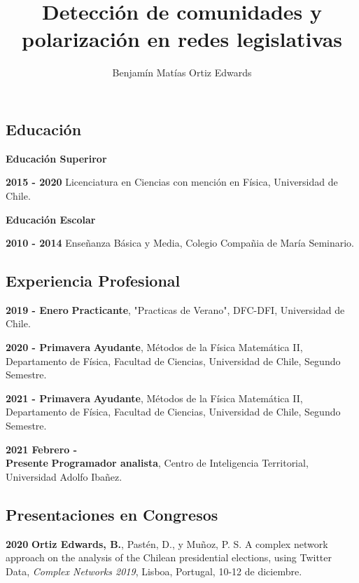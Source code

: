 \documentclass{proyectotesis}
\title{Detección de comunidades y polarización en redes legislativas}
\author{Benjamín Matías Ortiz Edwards}
\begin{document}
\maketitlepage
\makepersonalinfo

\subsection{Educación}
\begin{cvlist}{}
\item[\textbf{Educación Superiror}] 
\item[\textbf{2015 - 2020}] Licenciatura en Ciencias con mención en Física, Universidad de Chile.
\item[\bf Educación Escolar]
\item[\textbf{2010 - 2014}]  Enseñanza Básica y Media, Colegio Compañia de María Seminario.
\end{cvlist}

\subsection{Experiencia Profesional}
\begin{cvlist}{}
\item[\textbf{2019 - Enero}]  \textbf{Practicante}, "Practicas de Verano", DFC-DFI, Universidad de Chile.   
\item[\textbf{2020 - Primavera}]   \textbf{Ayudante},  Métodos de la Física Matemática II, Departamento de Física, Facultad de Ciencias, Universidad de Chile, Segundo Semestre.
\item[\textbf{2021 - Primavera}]   \textbf{Ayudante},  Métodos de la Física Matemática II, Departamento de Física, Facultad de Ciencias, Universidad de Chile, Segundo Semestre.
\item[\textbf{2021 Febrero -\\ Presente}] \textbf{Programador analista}, Centro de Inteligencia Territorial, Universidad Adolfo Ibañez. 

\end{cvlist}

\subsection{Presentaciones en Congresos}

\begin{cvlist}{}
\item[\textbf{2020}] \textbf{Ortiz Edwards, B.}, Pastén, D., y Muñoz, P. S. A complex network approach on the analysis of the Chilean presidential elections, using Twitter Data, {\it Complex Networks 2019}, Lisboa, Portugal, 10-12 de diciembre.

\end{cvlist}
\end{document}
